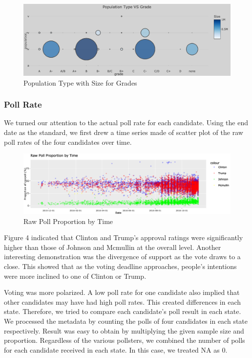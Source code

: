 \documentclass[
  11pt,
]{article}
\begin{document}
\begin{figure}

{\centering \includegraphics{./Figures/popChart} 

}

\caption{Population Type with Size for Grades}\label{fig:unnamed-chunk-12}
\end{figure}

\hypertarget{poll-rate}{%
\subsubsection{Poll Rate}\label{poll-rate}}

We turned our attention to the actual poll rate for each candidate.
Using the end date as the standard, we first drew a time series made of
scatter plot of the raw poll rates of the four candidates over time.

\begin{figure}

{\centering \includegraphics{./Figures/dotChart} 

}

\caption{Raw Poll Proportion by Time}\label{fig:unnamed-chunk-15}
\end{figure}

Figure 4 indicated that Clinton and Trump's approval ratings were
significantly higher than those of Johnson and Mcmullin at the overall
level. Another interesting demonstration was the divergence of support
as the vote draws to a close. This showed that as the voting deadline
approaches, people's intentions were more inclined to one of Clinton or
Trump.

Voting was more polarized. A low poll rate for one candidate also
implied that other candidates may have had high poll rates. This created
differences in each state. Therefore, we tried to compare each
candidate's poll result in each state. We processed the metadata by
counting the polls of four candidates in each state respectively. Result
was easy to obtain by multiplying the given sample size and proportion.
Regardless of the various pollsters, we combined the number of polls for
each candidate received in each state. In this case, we treated NA as 0.
\end{document}
